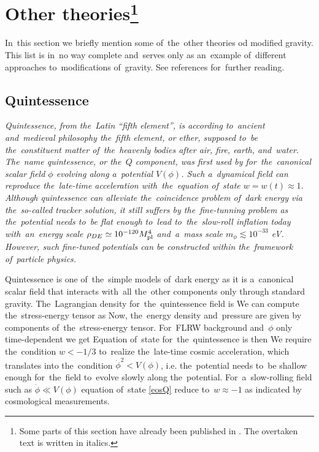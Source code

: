 \section[Other theories]{Other theories\footnote{Some parts of this section have already been published in \textcite{mastersthesis_vrastil}. The overtaken text is written in italics.}}
\label{sec:other}
In~this section we briefly mention some of~the~other theories od modified gravity. This list is in~no way complete and~serves only as an~example of~different approaches to~modifications of~gravity. See references for~further reading.
\subsection{Quintessence}
{\itshape
Quintessence, from the~Latin ``fifth element'', is according to~ancient and~medieval philosophy the~fifth element, or ether, supposed to~be the~constituent matter of~the~heavenly bodies after air, fire, earth, and~water. The~name quintessence, or the~$Q$ component, was first used by \textcite{1998PhRvL..80.1582C} for~the~canonical scalar field $\phi$ evolving along a~potential $V(\phi)$. Such a~dynamical field can reproduce the~late-time acceleration with~the~equation of~state $w=w(t)\approx1$. Although quintessence can alleviate the~coincidence problem of~dark energy via the~so-called tracker solution, it still suffers by the~fine-tunning problem as the~potential needs to~be flat enough to~lead to~the~slow-roll inflation today with~an~energy scale $\rho_{DE}\simeq10^{-120}M_{\text{\scriptsize pl}}^4$ and~a~mass scale $m_\phi\lesssim10^{-33}$ eV. However, such fine-tuned potentials can be constructed within the~framework of~particle physics.

Quintessence is one of~the~simple models of~dark energy as it is a~canonical scalar field that interacts with~all the~other components only through standard gravity. The~Lagrangian density for~the~quintessence field is
We can compute the~stress-energy tensor as
Now, the~energy density and~pressure are given by components of~the~stress-energy tensor. For~FLRW background and~$\phi$ only time-dependent we get
Equation of~state for~the~quintessence is then
We require the~condition $w<-1/3$ to~realize the~late-time cosmic acceleration, which translates into the~condition  $\dot{\phi}^2<V(\phi)$, i.e. the~potential needs to~be shallow enough for~the~field to~evolve slowly along the~potential. For~a~slow-rolling field such as $\dot{\phi}\ll V(\phi)$ equation of~state \eqref{eosQ} reduce to~$w\approx-1$ as indicated by cosmological measurements.

}
